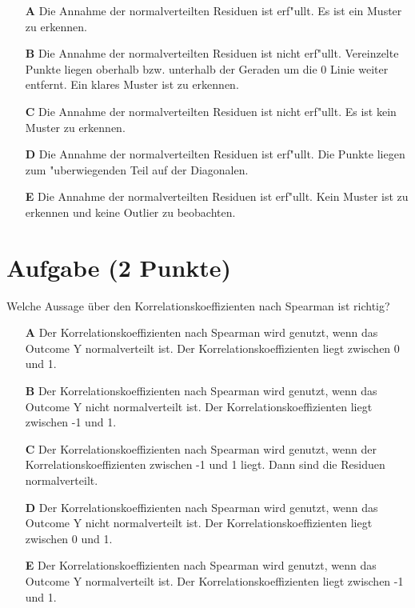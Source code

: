 \documentclass[a4paper, 9pt]{scrartcl}\usepackage[]{graphicx}\usepackage[]{xcolor}
\begin{document}
\begin{enumerate}
\item [\textbf{A} \msquare] Die Annahme der normalverteilten Residuen ist erf{"u}llt. Es ist ein Muster zu erkennen.
\item [\textbf{B} \msquare] Die Annahme der normalverteilten Residuen ist nicht erf{"u}llt. Vereinzelte Punkte liegen oberhalb bzw. unterhalb der Geraden um die 0 Linie weiter entfernt. Ein klares Muster ist zu erkennen.
\item [\textbf{C} \msquare] Die Annahme der normalverteilten Residuen ist nicht erf{"u}llt. Es ist kein Muster zu erkennen.
\item [\textbf{D} \msquare] Die Annahme der normalverteilten Residuen ist erf{"u}llt. Die Punkte liegen zum {"u}berwiegenden Teil auf der Diagonalen.
\item [\textbf{E} \msquare] Die Annahme der normalverteilten Residuen ist erf{"u}llt. Kein Muster ist zu erkennen und keine Outlier zu beobachten.
\end{enumerate}

\section{Aufgabe \hfill (2 Punkte)}




Welche Aussage {\"u}ber den Korrelationskoeffizienten nach Spearman
ist richtig?



\begin{enumerate}
\item [\textbf{A} \msquare] Der Korrelationskoeffizienten nach Spearman wird genutzt, wenn das Outcome Y normalverteilt ist. Der Korrelationskoeffizienten liegt zwischen 0 und 1.
\item [\textbf{B} \msquare] Der Korrelationskoeffizienten nach Spearman wird genutzt, wenn das Outcome Y nicht normalverteilt ist. Der Korrelationskoeffizienten liegt zwischen -1 und 1.
\item [\textbf{C} \msquare] Der Korrelationskoeffizienten nach Spearman wird genutzt, wenn der Korrelationskoeffizienten zwischen -1 und 1 liegt. Dann sind die Residuen normalverteilt.
\item [\textbf{D} \msquare] Der Korrelationskoeffizienten nach Spearman wird genutzt, wenn das Outcome Y nicht normalverteilt ist. Der Korrelationskoeffizienten liegt zwischen 0 und 1.
\item [\textbf{E} \msquare] Der Korrelationskoeffizienten nach Spearman wird genutzt, wenn das Outcome Y normalverteilt ist. Der Korrelationskoeffizienten liegt zwischen -1 und 1.
\end{enumerate}
\end{document}
